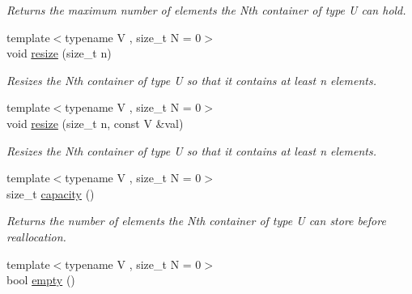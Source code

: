 \begin{DoxyCompactItemize}
\begin{DoxyCompactList}\small\item\em Returns the maximum number of elements the Nth container of type U can hold. \end{DoxyCompactList}\item 
\hypertarget{classheterogeneous_1_1heterovector_3_01_t_01_4_acd9925b750551765871c2746deb45a9c}{}{\footnotesize template$<$typename V , size\+\_\+t N = 0$>$ }\\void \hyperlink{classheterogeneous_1_1heterovector_3_01_t_01_4_acd9925b750551765871c2746deb45a9c}{resize} (size\+\_\+t n)\label{classheterogeneous_1_1heterovector_3_01_t_01_4_acd9925b750551765871c2746deb45a9c}

\begin{DoxyCompactList}\small\item\em Resizes the Nth container of type U so that it contains at least n elements. \end{DoxyCompactList}\item 
\hypertarget{classheterogeneous_1_1heterovector_3_01_t_01_4_a535f39dc5e50acbd33b0acc6a07567d0}{}{\footnotesize template$<$typename V , size\+\_\+t N = 0$>$ }\\void \hyperlink{classheterogeneous_1_1heterovector_3_01_t_01_4_a535f39dc5e50acbd33b0acc6a07567d0}{resize} (size\+\_\+t n, const V \&val)\label{classheterogeneous_1_1heterovector_3_01_t_01_4_a535f39dc5e50acbd33b0acc6a07567d0}

\begin{DoxyCompactList}\small\item\em Resizes the Nth container of type U so that it contains at least n elements. \end{DoxyCompactList}\item 
\hypertarget{classheterogeneous_1_1heterovector_3_01_t_01_4_a6023a46de716bbeb696b603f3326096b}{}{\footnotesize template$<$typename V , size\+\_\+t N = 0$>$ }\\size\+\_\+t \hyperlink{classheterogeneous_1_1heterovector_3_01_t_01_4_a6023a46de716bbeb696b603f3326096b}{capacity} ()\label{classheterogeneous_1_1heterovector_3_01_t_01_4_a6023a46de716bbeb696b603f3326096b}

\begin{DoxyCompactList}\small\item\em Returns the number of elements the Nth container of type U can store before reallocation. \end{DoxyCompactList}\item 
\hypertarget{classheterogeneous_1_1heterovector_3_01_t_01_4_af334233b624b9f4547bc21d8009e6949}{}{\footnotesize template$<$typename V , size\+\_\+t N = 0$>$ }\\bool \hyperlink{classheterogeneous_1_1heterovector_3_01_t_01_4_af334233b624b9f4547bc21d8009e6949}{empty} ()\label{classheterogeneous_1_1heterovector_3_01_t_01_4_af334233b624b9f4547bc21d8009e6949}


\end{DoxyCompactItemize}
